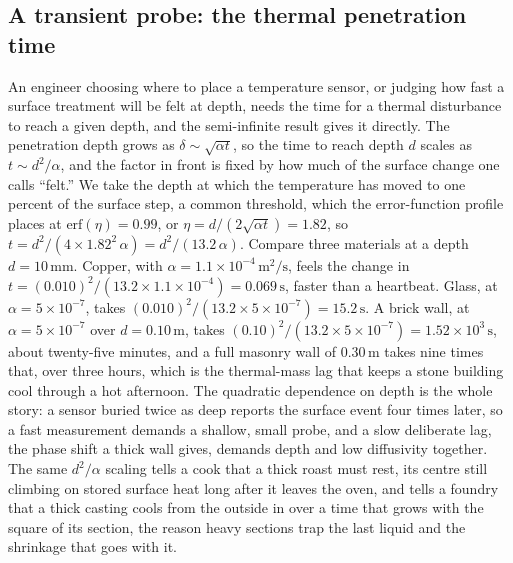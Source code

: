 \subsection{A transient probe: the thermal penetration time}

An engineer choosing where to place a temperature sensor, or judging how
fast a surface treatment will be felt at depth, needs the time for a
thermal disturbance to reach a given depth, and the semi-infinite result
gives it directly. The penetration depth grows as $\delta \sim \sqrt{\alpha
t}$, so the time to reach depth $d$ scales as $t \sim d^2/\alpha$, and the
factor in front is fixed by how much of the surface change one calls
``felt.'' We take the depth at which the temperature has moved to one
percent of the surface step, a common threshold, which the error-function
profile places at $\text{erf}(\eta) = 0.99$, or $\eta = d/(2\sqrt{\alpha t})
= 1.82$, so $t = d^2/(4\times1.82^2\,\alpha) = d^2/(13.2\,\alpha)$. Compare
three materials at a depth $d = 10\,\si{\milli\meter}$. Copper, with
$\alpha = 1.1\times10^{-4}\,\text{m}^2/\text{s}$, feels the change in
$t = (0.010)^2/(13.2\times1.1\times10^{-4}) = 0.069\,\text{s}$, faster than
a heartbeat. Glass, at $\alpha = 5\times10^{-7}$, takes
$(0.010)^2/(13.2\times5\times10^{-7}) = 15.2\,\text{s}$. A brick wall, at
$\alpha = 5\times10^{-7}$ over $d = 0.10\,\text{m}$, takes
$(0.10)^2/(13.2\times5\times10^{-7}) = 1.52\times10^3\,\text{s}$, about
twenty-five minutes, and a full masonry wall of $0.30\,\text{m}$ takes nine
times that, over three hours, which is the thermal-mass lag that keeps a
stone building cool through a hot afternoon. The quadratic dependence on
depth is the whole story: a sensor buried twice as deep reports the surface
event four times later, so a fast measurement demands a shallow, small
probe, and a slow deliberate lag, the phase shift a thick wall gives, demands
depth and low diffusivity together. The same $d^2/\alpha$ scaling tells a
cook that a thick roast must rest, its centre still climbing on stored
surface heat long after it leaves the oven, and tells a foundry that a thick
casting cools from the outside in over a time that grows with the square of
its section, the reason heavy sections trap the last liquid and the shrinkage
that goes with it.

